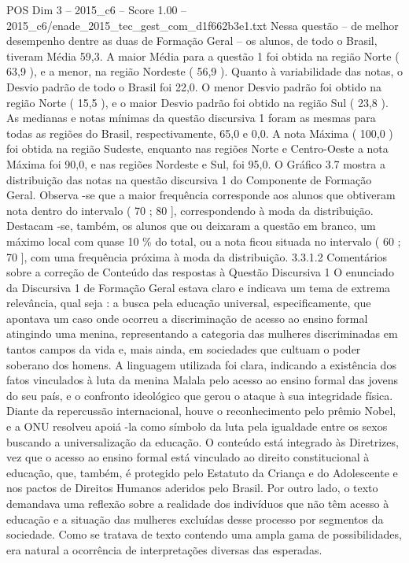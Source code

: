 \begin{textsample}{POS Dim 3 – 2015\_c6 – Score 1.00 – 2015\_c6/enade\_2015\_tec\_gest\_com\_d1f662b3e1.txt}
Nessa questão – de melhor desempenho dentre as duas de Formação Geral – os alunos, de todo o Brasil, tiveram Média 59,3.
A maior Média para a questão 1 foi obtida na região Norte ( 63,9 ), e a menor, na região Nordeste ( 56,9 ).
Quanto à variabilidade das notas, o Desvio padrão de todo o Brasil foi 22,0.
O menor Desvio padrão foi obtido na região Norte ( 15,5 ), e o maior Desvio padrão foi obtido na região Sul ( 23,8 ).
As medianas e notas mínimas da questão discursiva 1 foram as mesmas para todas as regiões do Brasil, respectivamente, 65,0 e 0,0.
A nota Máxima ( 100,0 ) foi obtida na região Sudeste, enquanto nas regiões Norte e Centro-Oeste a nota Máxima foi 90,0, e nas regiões Nordeste e Sul, foi 95,0.
O Gráfico 3.7 mostra a distribuição das notas na questão discursiva 1 do Componente de Formação Geral.
Observa -se que a maior frequência corresponde aos alunos que obtiveram nota dentro do intervalo ( 70 ; 80 ], correspondendo à moda da distribuição.
Destacam -se, também, os alunos que ou deixaram a questão em branco, um máximo local com quase 10 \% do total, ou a nota ficou situada no intervalo ( 60 ; 70 ], com uma frequência próxima à moda da distribuição. 3.3.1.2 Comentários sobre a correção de Conteúdo das respostas à Questão Discursiva 1 O enunciado da Discursiva 1 de Formação Geral estava claro e indicava um tema de extrema relevância, qual seja : a busca pela educação universal, especificamente, que apontava um caso onde ocorreu a discriminação de acesso ao ensino formal atingindo uma menina, representando a categoria das mulheres discriminadas em tantos campos da vida e, mais ainda, em sociedades que cultuam o poder soberano dos homens.
A linguagem utilizada foi clara, indicando a existência dos fatos vinculados à luta da menina Malala pelo acesso ao ensino formal das jovens do seu país, e o confronto ideológico que gerou o ataque à sua integridade física.
Diante da repercussão internacional, houve o reconhecimento pelo prêmio Nobel, e a ONU resolveu apoiá -la como símbolo da luta pela igualdade entre os sexos buscando a universalização da educação.
O conteúdo está integrado às Diretrizes, vez que o acesso ao ensino formal está vinculado ao direito constitucional à educação, que, também, é protegido pelo Estatuto da Criança e do Adolescente e nos pactos de Direitos Humanos aderidos pelo Brasil.
Por outro lado, o texto demandava uma reflexão sobre a realidade dos indivíduos que não têm acesso à educação e a situação das mulheres excluídas desse processo por segmentos da sociedade.
Como se tratava de texto contendo uma ampla gama de possibilidades, era natural a ocorrência de interpretações diversas das esperadas.

\end{textsample}
